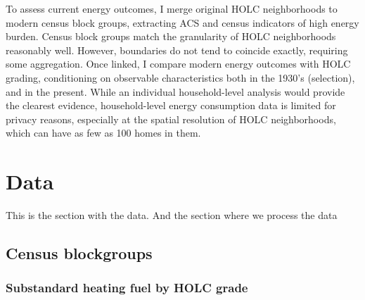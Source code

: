 \documentclass[
]{article}
\begin{document}
To assess current energy outcomes, I merge original HOLC neighborhoods
to modern census block groups, extracting ACS and census indicators of
high energy burden. Census block groups match the granularity of HOLC
neighborhoods reasonably well. However, boundaries do not tend to
coincide exactly, requiring some aggregation. Once linked, I compare
modern energy outcomes with HOLC grading, conditioning on observable
characteristics both in the 1930's (selection), and in the present.
While an individual household-level analysis would provide the clearest
evidence, household-level energy consumption data is limited for privacy
reasons, especially at the spatial resolution of HOLC neighborhoods,
which can have as few as 100 homes in them.

\hypertarget{section}{%
\paragraph{}\label{section}}

\hypertarget{data}{%
\section{Data}\label{data}}

This is the section with the data. And the section where we process the
data

\hypertarget{census-blockgroups}{%
\subsection{Census blockgroups}\label{census-blockgroups}}

\newpage

\hypertarget{substandard-heating-fuel-by-holc-grade}{%
\subsubsection{Substandard heating fuel by HOLC
grade}\label{substandard-heating-fuel-by-holc-grade}}
\end{document}
